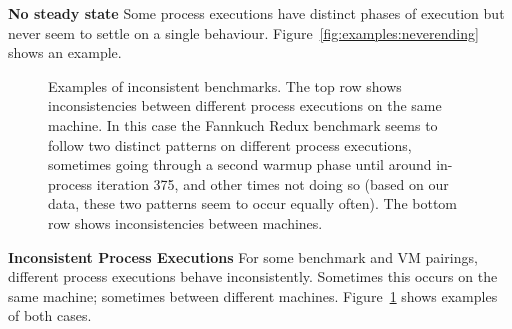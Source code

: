 \documentclass[preprint,numbers,10pt]{sigplanconf}
\begin{document}
\textbf{No steady state} \label{sub:long}
Some process executions have distinct phases of execution but never seem to
settle on a single behaviour. Figure~\ref{fig:examples:neverending} shows an
example.


\begin{figure}[t!]
\makebox[\textwidth][c]{~}  %
\caption{Examples of inconsistent benchmarks.
The top row shows inconsistencies between different process
executions on the same machine. In this case the Fannkuch Redux benchmark
seems to follow two distinct patterns on different process executions,
sometimes going through a second warmup phase until around in-process iteration 375, and
other times not doing so (based on our data, these two patterns seem to occur
equally often). The bottom row shows inconsistencies between
machines.}
\label{fig:examples:inconsistent}
\end{figure}

\textbf{Inconsistent Process Executions} \label{sub:inconsistent}
For some benchmark and VM pairings, different process executions behave
inconsistently. Sometimes this occurs on the same machine; sometimes between
different machines.
Figure~\ref{fig:examples:inconsistent} shows examples of both cases.
\end{document}
